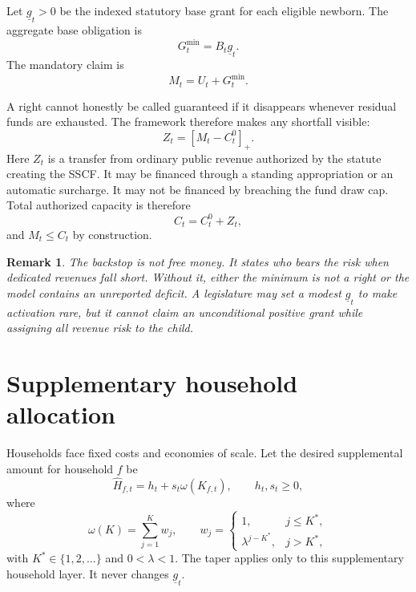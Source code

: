 \documentclass[11pt]{article}
\newtheorem{remark}[definition]{Remark}
\newcommand{\pos}[1]{\left[#1\right]_{+}}
\begin{document}
Let $\underline g_t>0$ be the indexed statutory base grant for each eligible newborn.
The aggregate base obligation is
\begin{equation}
  G_t^{\min}=B_t\underline g_t.
\end{equation}
The mandatory claim is
\begin{equation}
  M_t=U_t+G_t^{\min}.
\end{equation}

A right cannot honestly be called guaranteed if it disappears whenever residual funds
are exhausted. The framework therefore makes any shortfall visible:
\begin{equation}
  Z_t=\pos{M_t-C_t^0}.
\end{equation}
Here $Z_t$ is a transfer from ordinary public revenue authorized by the statute creating
the SSCF. It may be financed through a standing appropriation or an automatic surcharge.
It may not be financed by breaching the fund draw cap. Total authorized capacity is
therefore
\begin{equation}
  C_t=C_t^0+Z_t,
\end{equation}
and $M_t\le C_t$ by construction.

\begin{remark}
The backstop is not free money. It states who bears the risk when dedicated revenues
fall short. Without it, either the minimum is not a right or the model contains an
unreported deficit. A legislature may set a modest $\underline g_t$ to make activation
rare, but it cannot claim an unconditional positive grant while assigning all revenue
risk to the child.
\end{remark}

\section{Supplementary household allocation}

Households face fixed costs and economies of scale. Let the desired supplemental amount
for household $f$ be
\begin{equation}
  \widehat H_{f,t}=h_t+s_t\omega(K_{f,t}),
  \qquad h_t,s_t\ge0,
\end{equation}
where
\begin{equation}
  \omega(K)=\sum_{j=1}^{K}w_j,
  \qquad
  w_j=
  \begin{cases}
    1, & j\le K^*,\\
    \lambda^{j-K^*}, & j>K^*,
  \end{cases}
\end{equation}
with $K^*\in\{1,2,\ldots\}$ and $0<\lambda<1$. The taper applies only to this
supplementary household layer. It never changes $\underline g_t$.
\end{document}

